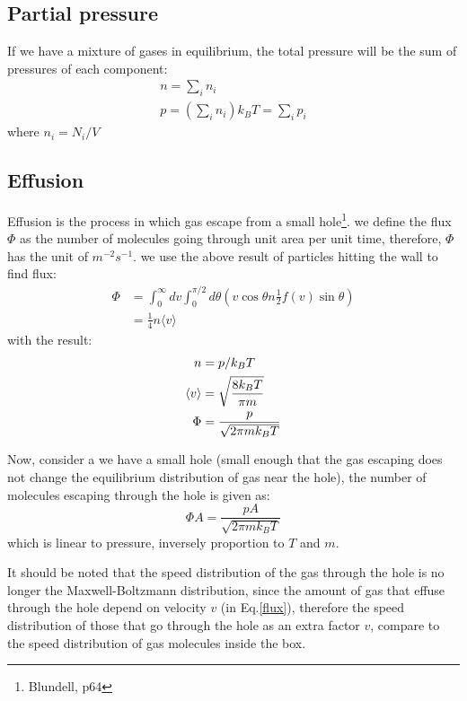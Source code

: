 \documentclass{article}
\begin{document}
\subsection*{Partial pressure}
If we have a mixture of gases in equilibrium, the total pressure will be the 
sum of pressures of each component:
\begin{gather}
    n = \sum_i n_i \\
    p = \left( \sum_i n_i \right) k_B T = \sum_i p_i
\end{gather}
where $n_i = N_i / V$

\subsection{Effusion}
Effusion is the process in which gas escape from a small hole\footnote{Blundell, p64}. we define 
the flux $\Phi$ as the number of molecules going through unit area per unit time,
therefore, $\Phi$ has the unit of $m^{-2}s^{-1}$. we use the above result of particles 
hitting the wall to find flux:
\begin{align}
    \Phi &= \int_0^{\infty} dv \int_0^{\pi/2} d\theta 
            \left( v \cos \theta n \frac{1}{2} f(v) \sin\theta \right) \label{flux} \\
        &= \frac{1}{4} n \langle v \rangle
\end{align}
with the result:
\begin{align}
    n &= p / k_B T \notag \\
    \langle v \rangle &= \sqrt{\frac{8k_BT}{\pi m}} \notag \\
    \Phi &= \frac{p}{\sqrt{2\pi m k_BT}}
\end{align}

Now, consider a we have a small hole (small enough that the gas escaping does not 
change the equilibrium distribution of gas near the hole), the number of molecules
escaping through the hole is given as:
\begin{equation}
    \Phi A = \frac{pA}{\sqrt{2\pi m k_BT}}
\end{equation}
which is linear to pressure, inversely proportion to $T$ and $m$. 

It should be noted that the speed distribution of the gas through the hole is no longer the 
Maxwell-Boltzmann distribution, since the amount of gas that effuse through the 
hole depend on velocity $v$ (in Eq.\ref{flux}), therefore the speed distribution
of those that go through the hole as an extra factor $v$, compare to the speed 
distribution of gas molecules inside the box.
\end{document}
